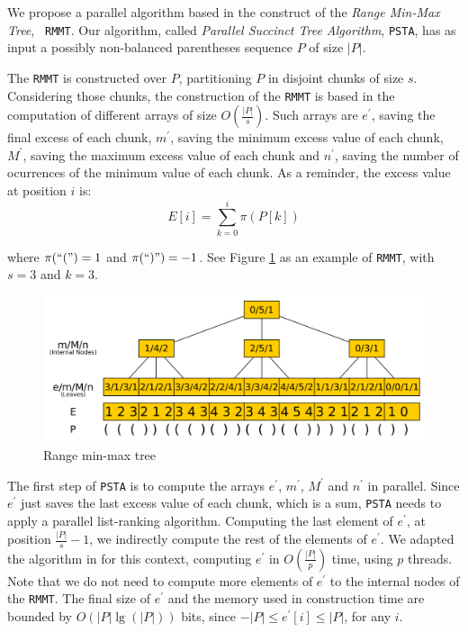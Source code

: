 We propose a parallel algorithm based in the construct of the
\emph{Range Min-Max Tree}, {\tt
  RMMT}\cite{Navarro:2014:FFS:2620785.2601073}. Our algorithm, called
\emph{Parallel Succinct Tree Algorithm}, {\tt PSTA}, has as input a
possibly non-balanced parentheses sequence $P$ of size $|P|$.

The {\tt RMMT} is constructed over $P$, partitioning $P$ in disjoint
chunks of size $s$. Considering those chunks, the construction of the
{\tt RMMT} is based in the computation of different arrays of size
$O(\frac{|P|}{s})$. Such arrays are $e^{\prime}$, saving the final
excess of each chunk, $m^{\prime}$, saving the minimum excess value of
each chunk, $M^{\prime}$, saving the maximum excess value of each
chunk and $n^{\prime}$, saving the number of ocurrences of the minimum
value of each chunk. As a reminder, the excess value at position $i$
is:
\begin{equation}
  \displaystyle E[i] = \sum_{k=0}^{i} \pi(P[k])
  \label{eq:excess}
\end{equation}

where $\pi(``(") = 1$ and $\pi(``)") = -1$. See Figure
\ref{fig:RangeMinMaxTree} as an example of {\tt RMMT}, with $s=3$ and
$k=3$.

\begin{figure}[ht]
  \centering
  \includegraphics[scale=0.18]{./images/Range-min-max-tree.png}
  \caption{Range min-max tree}
  \label{fig:RangeMinMaxTree} 
\end{figure}

The first step of {\tt PSTA} is to compute the arrays $e^{\prime}$,
$m^{\prime}$, $M^{\prime}$ and $n^{\prime}$ in parallel. Since
$e^{\prime}$ just saves the last excess value of each chunk, which is
a sum, {\tt PSTA} needs to apply a parallel list-ranking
algorithm. Computing the last element of $e^{\prime}$, at position
$\frac{|P|}{s}-1$, we indirectly compute the rest of the elements of
$e^{\prime}$. We adapted the algorithm in \cite{Helman2001265} for
this context, computing $e^{\prime}$ in $O(\frac{|P|}{p})$ time, using
$p$ threads. Note that we do not need to compute more elements of
$e^{\prime}$ to the internal nodes of the {\tt RMMT}. The final size
of $e^{\prime}$ and the memory used in construction time are bounded
by $O(|P|\lg(|P|))$ bits, since $-|P|\leq e^{\prime}[i]\leq |P|$, for any $i$.

